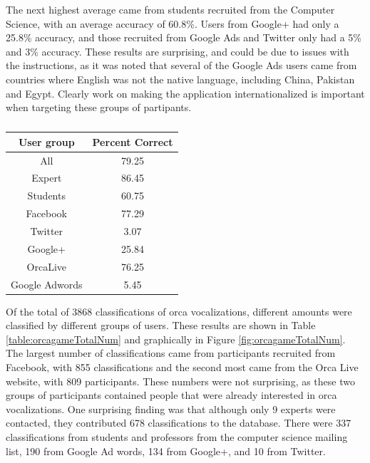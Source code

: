 \documentclass[12pt,oneside]{book}
\begin{document}
The next highest average came from students recruited from the
Computer Science, with an average accuracy of 60.8\%.  Users from
Google+ had only a 25.8\% accuracy, and those recruited from Google
Ads and Twitter only had a 5\% and 3\% accuracy.  These results are
surprising, and could be due to issues with the instructions, as it
was noted that several of the Google Ads users came from countries
where English was not the native language, including China, Pakistan
and Egypt.  Clearly work on making the application internationalized
is important when targeting these groups of partipants.

\begin{table}
\begin{tabular}{|c|c|}
\hline
User group & Percent Correct \\
\hline
All              &	79.25  \\
Expert           &	86.45  \\
Students         &	60.75  \\
Facebook         &	77.29  \\
Twitter          &	3.07   \\
Google+          &	25.84  \\
OrcaLive         &	76.25  \\
Google Adwords   &	5.45   \\
\hline
\end{tabular}
\caption{}
\label{table:percentCorrect}
\end{table}


Of the total of 3868 classifications of orca vocalizations, different
amounts were classified by different groups of users.  These results
are shown in Table \ref{table:orcagameTotalNum} and graphically in
Figure \ref{fig:orcagameTotalNum}.  The largest number of
classifications came from participants recruited from Facebook, with
855 classifications and the second most came from the Orca Live
website, with 809 participants.  These numbers were not surprising, as
these two groups of participants contained people that were already
interested in orca vocalizations.  One surprising finding was that
although only 9 experts were contacted, they contributed 678
classifications to the database.  There were 337 classifications from
students and professors from the computer science mailing list, 190
from Google Ad words, 134 from Google+, and 10 from Twitter.
\end{document}
